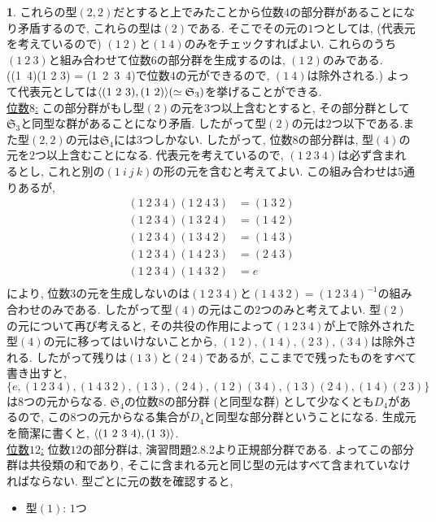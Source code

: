 \documentclass{amsart}
\theoremstyle{definition}
\newtheorem{ans}{}
\numberwithin{ans}{subsection}
\DeclarePairedDelimiter{\gen}{\langle}{\rangle}
\begin{document}
\begin{ans}
  これらの型$(2, 2)$だとすると上でみたことから位数$4$の部分群があることになり矛盾するので, これらの型は$(2)$である.
  そこでその元の$1$つとしては, (代表元を考えているので) $(1\ 2)$と$(1\ 4)$のみをチェックすればよい.
  これらのうち$(1\ 2\ 3)$と組み合わせて位数$6$の部分群を生成するのは, $(1\ 2)$のみである.
  ((1\ 4)(1 2 3) = (1\ 2\ 3\ 4)で位数$4$の元ができるので, $(1\ 4)$は除外される.)
  よって代表元としては$\gen{(1\ 2\ 3), (1\ 2)} (\simeq \mathfrak{S}_3)$を挙げることができる.\\
  \underline{位数$8$:}
  この部分群がもし型$(2)$の元を3つ以上含むとすると, その部分群として$\mathfrak{S}_3$と同型な群があることになり矛盾.
  したがって型$(2)$の元は$2$つ以下である.また型$(2, 2)$の元は$\mathfrak{S}_4$には3つしかない.
  したがって, 位数$8$の部分群は, 型$(4)$の元を$2$つ以上含むことになる.
  代表元を考えているので, $(1\ 2\ 3\ 4)$は必ず含まれるとし, これと別の$(1\ i\ j\ k)$の形の元を含むと考えてよい.
  この組み合わせは$5$通りあるが,
  \begin{align*}
    (1\ 2\ 3\ 4)(1\ 2\ 4\ 3) &= (1\ 3\ 2)\\
    (1\ 2\ 3\ 4)(1\ 3\ 2\ 4) &= (1\ 4\ 2)\\
    (1\ 2\ 3\ 4)(1\ 3\ 4\ 2) &= (1\ 4\ 3)\\
    (1\ 2\ 3\ 4)(1\ 4\ 2\ 3) &= (2\ 4\ 3)\\
    (1\ 2\ 3\ 4)(1\ 4\ 3\ 2) &= e\\
  \end{align*}
  により, 位数$3$の元を生成しないのは$(1\ 2\ 3\ 4)$と$(1\ 4\ 3\ 2) = (1\ 2\ 3\ 4)^{-1}$の組み合わせのみである.
  したがって型$(4)$の元はこの$2$つのみと考えてよい.
  型$(2)$の元について再び考えると, その共役の作用によって$(1\ 2\ 3\ 4)$が上で除外された型$(4)$の元に移ってはいけないことから,
  $(1\ 2), (1\ 4), (2\ 3), (3\ 4)$は除外される. したがって残りは$(1\ 3)$と$(2\ 4)$であるが,
  ここまでで残ったものをすべて書き出すと,
  $\{e, (1\ 2\ 3\ 4), (1\ 4\ 3\ 2), (1\ 3), (2\ 4), (1\ 2)(3\ 4), (1\ 3)(2\ 4), (1\ 4)(2\ 3) \}$
  は$8$つの元からなる. $\mathfrak{S_4}$の位数$8$の部分群 (と同型な群) として少なくとも$D_4$があるので,
  この$8$つの元からなる集合が$D_4$と同型な部分群ということになる.
  生成元を簡潔に書くと, $\gen{(1\ 2\ 3\ 4), (1\ 3)}$.\\
  \underline{位数$12$:}
  位数$12$の部分群は, 演習問題2.8.2より正規部分群である.
  よってこの部分群は共役類の和であり,
  そこに含まれる元と同じ型の元はすべて含まれていなければならない.
  型ごとに元の数を確認すると,
  \begin{itemize}
    \item 型$(1)$: $1$つ

\end{itemize}
\end{ans}
\end{document}
